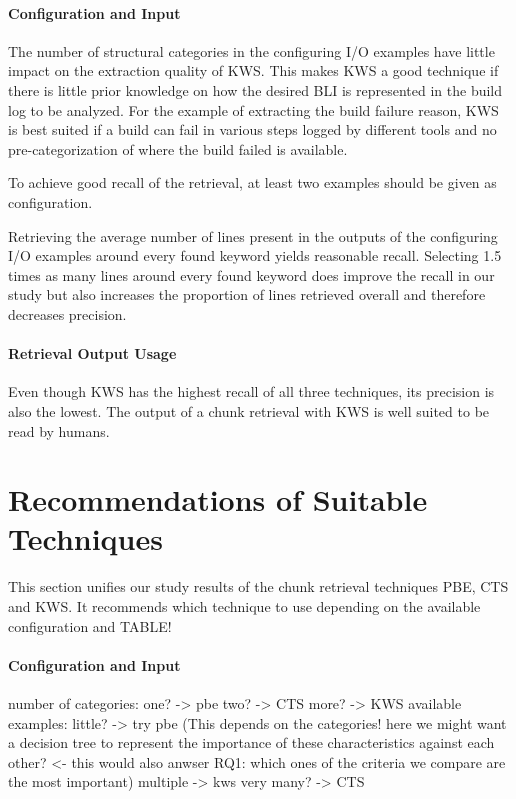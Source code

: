 \documentclass[\myrootdir/main.tex]{subfiles}
\begin{document}
\paragraph{Configuration and Input}
The number of structural categories in the configuring I/O examples have little impact on the extraction quality of KWS\@.
This makes KWS a good technique if there is little prior knowledge on how the desired BLI is represented in the build log to be analyzed.
For the example of extracting the build failure reason, KWS is best suited if a build can fail in various steps logged by different tools and no pre-categorization of where the build failed is available.

To achieve good recall of the retrieval, at least two examples should be given as configuration.

Retrieving the average number of lines present in the outputs of the configuring I/O examples around every found keyword yields reasonable recall.
Selecting 1.5 times as many lines around every found keyword does improve the recall in our study but also increases the proportion of lines retrieved overall and therefore decreases precision.

\paragraph{Retrieval Output Usage}
Even though KWS has the highest recall of all three techniques, its precision is also the lowest.
The output of a chunk retrieval with KWS is well suited to be read by humans.

\section{Recommendations of Suitable Techniques}
This section unifies our study results of the chunk retrieval techniques PBE, CTS and KWS\@.
It recommends which technique to use depending on the available configuration and 
TABLE!
\paragraph{Configuration and Input}
number of categories:
one? -> pbe
two? -> CTS
more? -> KWS
available examples:
little? -> try pbe (This depends on the categories! here we might want a decision tree to represent the importance of these characteristics against each other? <- this would also anwser RQ1: which ones of the criteria we compare are the most important)
multiple -> kws
very many? -> CTS
\end{document}
